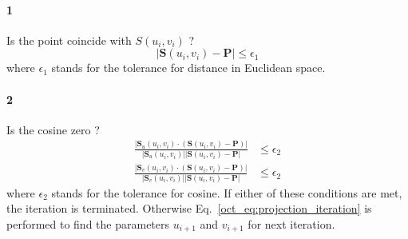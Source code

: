 \paragraph{1}
Is the point coincide with $S(u_i, v_i)$ ?
\begin{equation*}
    |\mathbf{S} (u_i, v_i) - \mathbf{P}| \leq \epsilon_1
\end{equation*}
%
where $\epsilon_1$ stands for the tolerance for distance in Euclidean space.
\paragraph{2}
Is the cosine zero ?
\begin{align*}
    \frac{
        |\mathbf{S}_u (u_i, v_i) \cdot
        \left(
            \mathbf{S}(u_i, v_i) - \mathbf{P}
        \right)|
    }{
        |\mathbf{S}_u (u_i, v_i)|
        |\mathbf{S}(u_i, v_i) - \mathbf{P}|
    } & \leq \epsilon_2 \\
    \frac{
        |\mathbf{S}_v (u_i, v_i) \cdot
        \left(
            \mathbf{S}(u_i, v_i) - \mathbf{P}
        \right)|
    }{
        |\mathbf{S}_v (u_i, v_i)|
        |\mathbf{S}(u_i, v_i) - \mathbf{P}|
    } & \leq \epsilon_2
\end{align*}
%
where $\epsilon_2$ stands for the tolerance for cosine.
If either of these conditions are met, the iteration is terminated.
Otherwise Eq.~\ref{oct_eq:projection_iteration} is performed to find the parameters $u_{i+1}$ and $v_{i+1}$ for next iteration.
